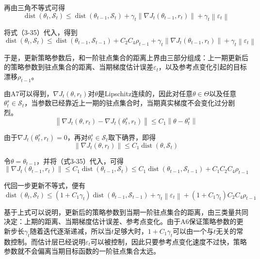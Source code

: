 再由三角不等式可得
\begin{equation}
\operatorname{dist}(\theta_t,\mathcal S_t)
\le
\operatorname{dist}(\theta_{t-1},\mathcal S_t)
+
\gamma_t
\left\|
\nabla J_t(\theta_{t-1},r_t)
\right\|
+
\gamma_t
\left\|
\varepsilon_t
\right\|
\end{equation}

将式（3-35）代入，得到
\begin{equation}
\operatorname{dist}(\theta_t,\mathcal S_t)
\le
\operatorname{dist}(\theta_{t-1},\mathcal S_{t-1})
+
C_2 C_4 \rho_{t-1}
+
\gamma_t
\left\|
\nabla J_t(\theta_{t-1},r_t)
\right\|
+
\gamma_t
\left\|
\varepsilon_t
\right\|
\end{equation}

于是，更新策略参数后，和一阶驻点集合的距离上界由三部分组成：上一期更新后的策略参数到驻点集合的距离、当期梯度估计误差$\varepsilon_t$，以及参考点变化引起的目标漂移$\rho_{t-1}$。

由A7可以得到，$\nabla J_t(\theta,r_t)$对$\theta$是Lipschitz连续的，因此对任意$\theta \in \Theta$以及任意$\theta^s_t \in \mathcal S_t$，当参数已经靠近上一期的驻点集合时，当期真实梯度不会变化过分剧烈。
\begin{equation}
\left\|
\nabla J_t(\theta,r_t)-\nabla J_t(\theta^s_t,r_t)
\right\|
\le
C_1
\left\|
\theta-\theta^s_t
\right\|
\end{equation}

由于$\nabla J_t(\theta^s_t,r_t)=0$，再对$\theta^s_t \in \mathcal S_t$取下确界，即得
\begin{equation}
\left\|
\nabla J_t(\theta,r_t)
\right\|
\le
C_1
\operatorname{dist}(\theta,\mathcal S_t)
\end{equation}

令$\theta=\theta_{t-1}$，并将（式3-35）代入，可得
\begin{equation}
\left\|
\nabla J_t(\theta_{t-1},r_t)
\right\|
\le
C_1
\operatorname{dist}(\theta_{t-1},\mathcal S_t)
\le
C_1
\operatorname{dist}(\theta_{t-1},\mathcal S_{t-1})
+
C_1 C_2 C_4 \rho_{t-1}
\end{equation}

代回一步更新不等式，便有
\begin{equation}
\operatorname{dist}(\theta_t,\mathcal S_t)
\le
\left(1+C_1 \gamma_t\right)
\operatorname{dist}(\theta_{t-1},\mathcal S_{t-1})
+
\gamma_t
\left\|
\varepsilon_t
\right\|
+
\left(1+C_1 \gamma_t\right) C_2 C_4 \rho_{t-1}
\end{equation}

基于上式可以说明，更新后的策略参数到当期一阶驻点集合的距离，由三类量共同决定：上期的距离、当期梯度估计误差、参考点变化。由于A6保证策略参数的更新步长$\gamma_t$随着迭代逐渐递减，所以当$t$足够大时，$1+C_1\gamma_t$可以由一个与$t$无关的常数控制。而估计层已经说明$\varepsilon_t$可以被控制，因此只要参考点变化速度不过快，策略参数就不会偏离当期目标函数的一阶驻点集合太远。

